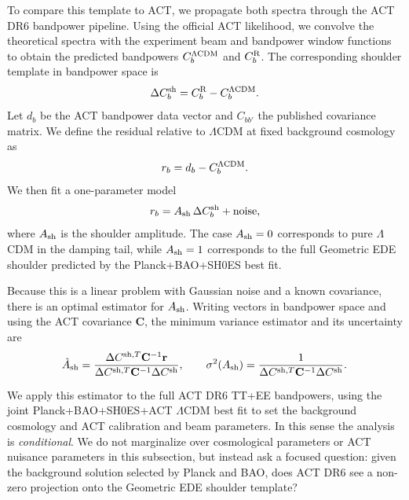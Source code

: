 \documentclass[a4paper,11pt]{article}
\begin{document}
To compare this template to ACT, we propagate both spectra through the ACT DR6 bandpower pipeline. Using the official ACT likelihood, we convolve the theoretical spectra with the experiment beam and bandpower window functions to obtain the predicted bandpowers $C_b^{\Lambda{\rm CDM}}$ and $C_b^{\rm R}$. The corresponding shoulder template in bandpower space is
\begin{equation}
\Delta C_b^{\rm sh} = C_b^{\rm R} - C_b^{\Lambda{\rm CDM}}.
\end{equation}
Let $d_b$ be the ACT bandpower data vector and $C_{bb'}$ the published covariance matrix. We define the residual relative to $\Lambda$CDM at fixed background cosmology as
\begin{equation}
r_b = d_b - C_b^{\Lambda{\rm CDM}}.
\end{equation}
We then fit a one-parameter model
\begin{equation}
r_b = A_{\rm sh}\,\Delta C_b^{\rm sh} + \text{noise},
\end{equation}
where $A_{\rm sh}$ is the shoulder amplitude. The case $A_{\rm sh}=0$ corresponds to pure $\Lambda$CDM in the damping tail, while $A_{\rm sh}=1$ corresponds to the full Geometric EDE shoulder predicted by the Planck+BAO+SH0ES best fit.

Because this is a linear problem with Gaussian noise and a known covariance, there is an optimal estimator for $A_{\rm sh}$. Writing vectors in bandpower space and using the ACT covariance $\mathbf{C}$, the minimum variance estimator and its uncertainty are
\begin{equation}
\hat A_{\rm sh} = \frac{\Delta C^{{\rm sh},T} \mathbf{C}^{-1} \mathbf{r}}{\Delta C^{{\rm sh},T} \mathbf{C}^{-1} \Delta C^{\rm sh}}, \qquad
\sigma^2(A_{\rm sh}) = \frac{1}{\Delta C^{{\rm sh},T} \mathbf{C}^{-1} \Delta C^{\rm sh}}.
\end{equation}

We apply this estimator to the full ACT DR6 TT+EE bandpowers, using the joint Planck+BAO+SH0ES+ACT $\Lambda$CDM best fit to set the background cosmology and ACT calibration and beam parameters. In this sense the analysis is \emph{conditional}. We do not marginalize over cosmological parameters or ACT nuisance parameters in this subsection, but instead ask a focused question: given the background solution selected by Planck and BAO, does ACT DR6 see a non-zero projection onto the Geometric EDE shoulder template?
\end{document}
